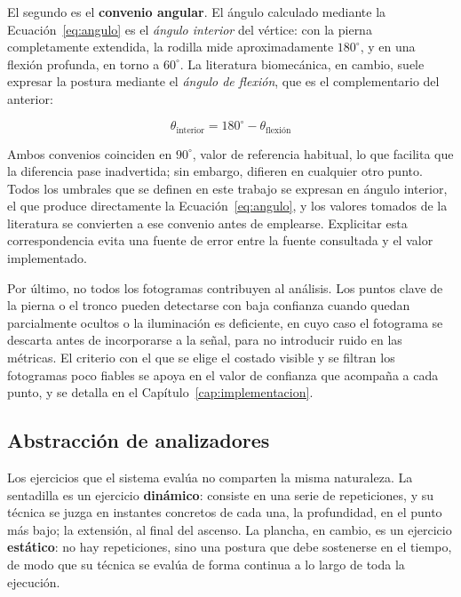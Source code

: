 \documentclass[12pt,a4paper,twoside,openright]{book}
\begin{document}
    El segundo es el \textbf{convenio angular}. El ángulo calculado mediante la
    Ecuación~\ref{eq:angulo} es el \textit{ángulo interior} del vértice: con la
    pierna completamente extendida, la rodilla mide aproximadamente $180^\circ$,
    y en una flexión profunda, en torno a $60^\circ$. La literatura biomecánica,
    en cambio, suele expresar la postura mediante el \textit{ángulo de flexión},
    que es el complementario del anterior:

    \begin{equation}
        \theta_{\text{interior}} = 180^\circ - \theta_{\text{flexión}}
        \label{eq:convenio}
    \end{equation}

    Ambos convenios coinciden en $90^\circ$, valor de referencia habitual, lo que
    facilita que la diferencia pase inadvertida; sin embargo, difieren en
    cualquier otro punto. Todos los umbrales que se definen en este trabajo se
    expresan en ángulo interior, el que produce directamente la
    Ecuación~\ref{eq:angulo}, y los valores tomados de la literatura se convierten
    a ese convenio antes de emplearse. Explicitar esta correspondencia evita una
    fuente de error entre la fuente consultada y el valor implementado.

    Por último, no todos los fotogramas contribuyen al análisis. Los puntos
    clave de la pierna o el tronco pueden detectarse con baja confianza cuando
    quedan parcialmente ocultos o la iluminación es deficiente, en cuyo caso el
    fotograma se descarta antes de incorporarse a la señal, para no introducir
    ruido en las métricas. El criterio con el que se elige el costado visible y
    se filtran los fotogramas poco fiables se apoya en el valor de confianza que
    acompaña a cada punto, y se detalla en el Capítulo~\ref{cap:implementacion}.

    \subsection{Abstracción de analizadores}

    Los ejercicios que el sistema evalúa no comparten la misma naturaleza. La
    sentadilla es un ejercicio \textbf{dinámico}: consiste en una serie de
    repeticiones, y su técnica se juzga en instantes concretos de cada una, la
    profundidad, en el punto más bajo; la extensión, al final del ascenso. La
    plancha, en cambio, es un ejercicio \textbf{estático}: no hay repeticiones,
    sino una postura que debe sostenerse en el tiempo, de modo que su técnica se
    evalúa de forma continua a lo largo de toda la ejecución.
\end{document}
